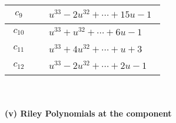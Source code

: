 \documentclass[1p]{elsarticle_modified}
\theoremstyle{definition}
\begin{document}
\begin{tabular}{m{50pt}|m{274pt}}
\hline $$\begin{aligned}c_{9}\end{aligned}$$&$\begin{aligned}
&u^{33}-2 u^{32}+\cdots+15 u-1
\end{aligned}$\\
\hline $$\begin{aligned}c_{10}\end{aligned}$$&$\begin{aligned}
&u^{33}+u^{32}+\cdots+6 u-1
\end{aligned}$\\
\hline $$\begin{aligned}c_{11}\end{aligned}$$&$\begin{aligned}
&u^{33}+4 u^{32}+\cdots+u+3
\end{aligned}$\\
\hline $$\begin{aligned}c_{12}\end{aligned}$$&$\begin{aligned}
&u^{33}-2 u^{32}+\cdots+2 u-1
\end{aligned}$\\
\hline
\end{tabular}\\~\\
\newpage\renewcommand{\arraystretch}{1}
\flushleft \textbf{(v) Riley Polynomials at the component}\newline \\
\end{document}
